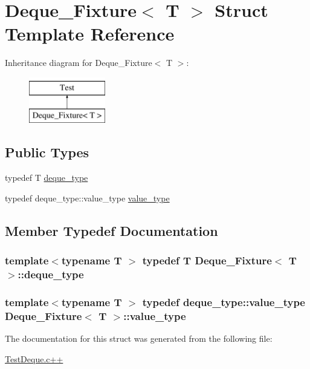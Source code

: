 \hypertarget{structDeque__Fixture}{\section{Deque\-\_\-\-Fixture$<$ T $>$ Struct Template Reference}
\label{structDeque__Fixture}
}
Inheritance diagram for Deque\-\_\-\-Fixture$<$ T $>$\-:\begin{figure}[H]
\begin{center}
\leavevmode
\includegraphics[height=2.000000cm]{structDeque__Fixture}
\end{center}
\end{figure}
\subsection*{Public Types}
\begin{DoxyCompactItemize}
\item 
typedef T \hyperlink{structDeque__Fixture_aff55aebc9f3732e55b5e9afae069a6e7}{deque\-\_\-type}
\item 
typedef deque\-\_\-type\-::value\-\_\-type \hyperlink{structDeque__Fixture_ad3f31d2190bcef2a8809aae173c159e9}{value\-\_\-type}
\end{DoxyCompactItemize}


\subsection{Member Typedef Documentation}
\hypertarget{structDeque__Fixture_aff55aebc9f3732e55b5e9afae069a6e7}{
\subsubsection[{deque\-\_\-type}]{\setlength{\rightskip}{0pt plus 5cm}template$<$typename T $>$ typedef T {\bf Deque\-\_\-\-Fixture}$<$ T $>$\-::{\bf deque\-\_\-type}}}\label{structDeque__Fixture_aff55aebc9f3732e55b5e9afae069a6e7}
\hypertarget{structDeque__Fixture_ad3f31d2190bcef2a8809aae173c159e9}{
\subsubsection[{value\-\_\-type}]{\setlength{\rightskip}{0pt plus 5cm}template$<$typename T $>$ typedef deque\-\_\-type\-::value\-\_\-type {\bf Deque\-\_\-\-Fixture}$<$ T $>$\-::{\bf value\-\_\-type}}}\label{structDeque__Fixture_ad3f31d2190bcef2a8809aae173c159e9}


The documentation for this struct was generated from the following file\-:\begin{DoxyCompactItemize}
\item 
\hyperlink{TestDeque_8c_09_09}{Test\-Deque.\-c++}\end{DoxyCompactItemize}
